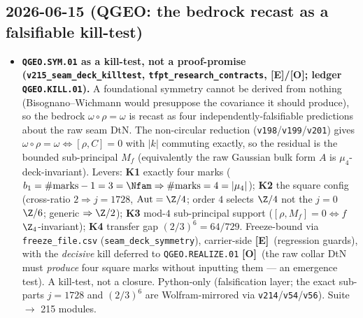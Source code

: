 \documentclass[11pt]{article}
\providecommand{\mE}{\textbf{[E]}}\providecommand{\mC}{\textbf{[C]}}
\providecommand{\mO}{\textbf{[O]}}\providecommand{\mX}{\textbf{[X]}}
\begin{document}
\subsection*{2026-06-15 (QGEO: the bedrock recast as a falsifiable kill-test)}
\begin{itemize}
\item \textbf{\texttt{QGEO.SYM.01} as a kill-test, not a proof-promise (\texttt{v215\_seam\_deck\_killtest},
  \texttt{tfpt\_research\_contracts}, \mE/\mO; ledger \texttt{QGEO.KILL.01}).} A foundational symmetry cannot
  be derived from nothing (Bisognano--Wichmann would presuppose the covariance it should produce), so the
  bedrock $\omega\circ\rho=\omega$ is recast as four independently-falsifiable predictions about the raw seam
  DtN. The non-circular reduction (\texttt{v198}/\texttt{v199}/\texttt{v201}) gives
  $\omega\circ\rho=\omega\Leftrightarrow[\rho,C]=0$ with $|k|$ commuting exactly, so the residual is the
  bounded sub-principal $M_f$ (equivalently the raw Gaussian bulk form $A$ is $\mu_4$-deck-invariant). Levers:
  \textbf{K1} exactly four marks ($b_1=\#\text{marks}-1=3=\Nfam\Rightarrow\#\text{marks}=4=|\mu_4|$);
  \textbf{K2} the square config (cross-ratio $2\Rightarrow j=1728$, $\mathrm{Aut}=\Z/4$; order $4$ selects
  $\Z/4$ not the $j=0$ $\Z/6$; generic $\Rightarrow\Z/2$); \textbf{K3} mod-$4$ sub-principal support
  ($[\rho,M_f]=0\Leftrightarrow f$ $\Z_4$-invariant); \textbf{K4} transfer gap $(2/3)^6=64/729$. Freeze-bound
  via \texttt{freeze\_file.csv} (\texttt{seam\_deck\_symmetry}), carrier-side \mE\ (regression guards), with
  the \emph{decisive} kill deferred to \texttt{QGEO.REALIZE.01} \mO\ (the raw collar DtN must \emph{produce}
  four square marks without inputting them --- an emergence test). A kill-test, not a closure. Python-only
  (falsification layer; the exact sub-parts $j=1728$ and $(2/3)^6$ are Wolfram-mirrored via
  \texttt{v214}/\texttt{v54}/\texttt{v56}). Suite $\to$ 215 modules.
\end{itemize}
\end{document}
